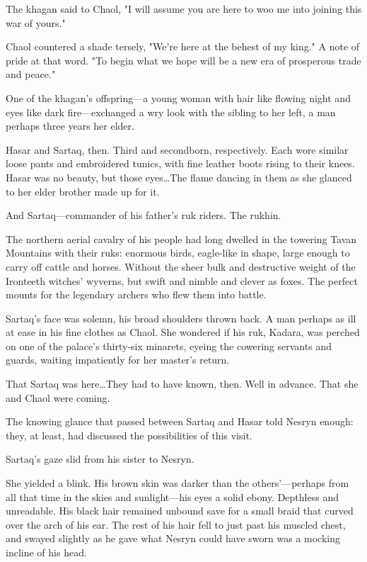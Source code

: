 The khagan said to Chaol, "I will assume you are here to woo me into joining this war of yours."

Chaol countered a shade tersely, "We're here at the behest of my king."
A note of pride at that word.
"To begin what we hope will be a new era of prosperous trade and peace."

One of the khagan's offspring---a young woman with hair like flowing night and eyes like dark fire---exchanged a wry look with the sibling to her left, a man perhaps three years her elder.

Hasar and Sartaq, then.
Third and secondborn, respectively.
Each wore similar loose pants and embroidered tunics, with fine leather boots rising to their knees.
Hasar was no beauty, but those eyes\ldots The flame dancing in them as she glanced to her elder brother made up for it.

And Sartaq---commander of his father's ruk riders.
The rukhin.

The northern aerial cavalry of his people had long dwelled in the towering Tavan Mountains with their ruks: enormous birds, eagle-like in shape, large enough to carry off cattle and horses.
Without the sheer bulk and destructive weight of the Ironteeth witches' wyverns, but swift and nimble and clever as foxes.
The perfect mounts for the legendary archers who flew them into battle.

Sartaq's face was solemn, his broad shoulders thrown back.
A man perhaps as ill at ease in his fine clothes as Chaol.
She wondered if his ruk, Kadara, was perched on one of the palace's thirty-six minarets, eyeing the cowering servants and guards, waiting impatiently for her master's return.

That Sartaq was here\ldots They had to have known, then.
Well in advance.
That she and Chaol were coming.

The knowing glance that passed between Sartaq and Hasar told Nesryn enough: they, at least, had discussed the possibilities of this visit.

Sartaq's gaze slid from his sister to Nesryn.

She yielded a blink.
His brown skin was darker than the others'---perhaps from all that time in the skies and sunlight---his eyes a solid ebony.
Depthless and unreadable.
His black hair remained unbound save for a small braid that curved over the arch of his ear.
The rest of his hair fell to just past his muscled chest, and swayed slightly as he gave what Nesryn could have sworn was a mocking incline of his head.

